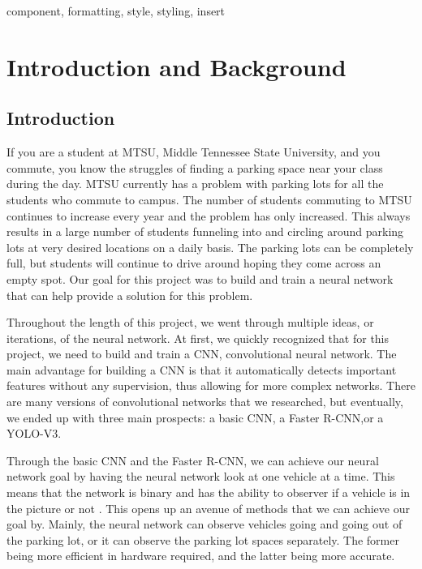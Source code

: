 \documentclass[conference]{IEEEtran}
\begin{document}

\begin{IEEEkeywords}
component, formatting, style, styling, insert
\end{IEEEkeywords}

\section{Introduction and Background}

\subsection{Introduction}
If you are a student at MTSU, Middle Tennessee State University, and you commute, you know the struggles of finding a parking space near your class during the day. MTSU currently has a problem with parking lots for all the students who commute to campus. The number of students commuting to MTSU continues to increase every year and the problem has only increased. This always results in a large number of students funneling into and circling around parking lots at very desired locations on a daily basis. The parking lots can be completely full, but students will continue to drive around hoping they come across an empty spot. Our goal for this project was to build and train a neural network that can help provide a solution for this problem. 

Throughout the length of this project, we went through multiple ideas, or iterations, of the neural network. At first, we quickly recognized that for this project, we need to build and train a CNN, convolutional neural network. The main advantage for building a CNN is that it automatically detects important features without any supervision, thus allowing for more complex networks.\cite{b1} There are many versions of convolutional networks that we researched, but eventually, we ended up with three main prospects: a basic CNN, a Faster R-CNN,or a YOLO-V3. 

Through the basic CNN and the Faster R-CNN, we can achieve our neural network goal by having the neural network look at one vehicle at a time. This means that the network is binary and has the ability to observer if a vehicle is in the picture or not \cite{b1}. This opens up an avenue of methods that we can achieve our goal by. Mainly, the neural network can observe vehicles going and going out of the parking lot, or it can observe the parking lot spaces separately. The former being more efficient in hardware required, and the latter being more accurate.
\end{document}
